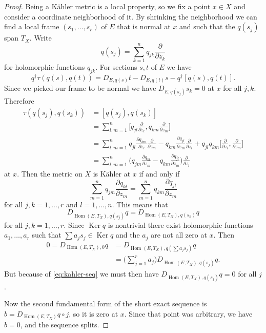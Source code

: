 \documentclass[11pt]{amsart}
\theoremstyle{definition}
\DeclareMathOperator{\Ker}{Ker}
\DeclareMathOperator{\Hom}{Hom}
\begin{document}
\begin{proof}
Being a K\"ahler metric is a local property, so we fix a point $x \in X$ and consider a coordinate neighborhood of it.
By shrinking the neighborhood we can find a local frame $(s_1, \ldots, s_r)$ of $E$ that is normal at $x$ and such that the $q(s_j)$ span $T_X$.
Write
\[
q(s_j) = \sum_{k=1}^n q_{jk} \frac{\partial}{\partial z_k}
\]
for holomorphic functions $q_{jk}$.
For sections $s,t$ of $E$ we have
\[
q^\dagger \tau(q(s), q(t))
= D_{E,q(s)} t - D_{E,q(t)} s - q^\dagger [q(s), q(t)].
\]
Since we picked our frame to be normal we have $D_{E,q(s_j)} s_k = 0$ at $x$ for all $j,k$.
Therefore
\begin{align*}
\tau(q(s_j), q(s_k))
&= [q(s_j), q(s_k)]
\\
&= \sum_{l,m=1}^n 
\biggl[
q_{jl} \frac{\partial}{\partial z_l},
q_{km} \frac{\partial}{\partial z_m}
\biggr]
\\
&= \sum_{l,m=1}^n 
q_{jl} \frac{\partial q_{km}}{\partial z_l} \frac{\partial}{\partial z_m}
- q_{km} \frac{\partial q_{jl}}{\partial z_m} \frac{\partial}{\partial z_l}
+ q_{jl} q_{km} 
\biggl[
\frac{\partial}{\partial z_l},
\frac{\partial}{\partial z_m}
\biggr]
\\
&= \sum_{l,m=1}^n 
\biggl(
q_{jm} \frac{\partial q_{kl}}{\partial z_m}
- q_{km} \frac{\partial q_{jl}}{\partial z_m}
\biggr)
\frac{\partial}{\partial z_l}
\end{align*}
at $x$.
Then the metric on $X$ is K\"ahler at $x$ if and only if
\[
\sum_{m=1}^n q_{jm} \frac{\partial q_{kl}}{\partial z_m}
= \sum_{m=1}^n q_{km} \frac{\partial q_{jl}}{\partial z_m}
\]
for all $j,k = 1,\ldots,r$ and $l = 1,\ldots,n$.
This means that
\begin{equation}
\label{eq:kahler-seq}
D_{\Hom(E,T_X),q(s_j)} q = D_{\Hom(E,T_X),q(s_k)} q
\end{equation}
for all $j,k = 1,\ldots,r$.
Since $\Ker q$ is nontrivial there exist holomorphic functions $a_1, \ldots, a_r$ such that $\sum a_j s_j \in \Ker q$ and the $a_j$ are not all zero at $x$.
Then
\begin{align*}
0 = D_{\Hom(E,T_X),0} q
&= D_{\Hom(E,T_X),q(\sum a_j s_j)} q
\\
&= \biggl(\sum_{j=1}^r a_j \biggr) D_{\Hom(E,T_X),q(s_j)} q.
\end{align*}
But because of \eqref{eq:kahler-seq} we must then have $D_{\Hom(E,T_X),q(s_j)} q = 0$ for all $j$.

Now the second fundamental form of the short exact sequence is $b = D_{\Hom(E,T_X)}q \circ j$, so it is zero at $x$.
Since that point was arbitrary, we have $b = 0$, and the sequence splits.
\end{proof}
\end{document}
